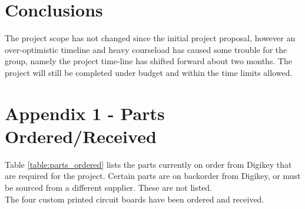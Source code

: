 \documentclass[12pt]{report}
\begin{document}
  \pagebreak

  \section{Conclusions}

  The project scope has not changed since the initial project proposal, however an over-optimistic timeline and heavy courseload has caused some trouble for the group, namely the project time-line has shifted forward about two months. The project will still be completed under budget and within the time limits allowed. 

  \pagebreak

  \section*{Appendix 1 - Parts Ordered/Received}

  Table \ref{table:parts_ordered} lists the parts currently on order from Digikey that are required for the project. Certain parts are on backorder from Digikey, or must be sourced from a different supplier. These are not listed.\\

  The four custom printed circuit boards have been ordered and received.
\end{document}
